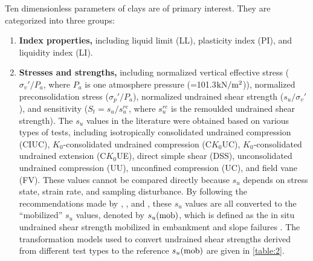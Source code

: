     
\begin{paracol}{2}
    
    Ten dimensionless parameters of clays are of primary interest. They are categorized into three groups:
    \begin{enumerate}
        \item \textbf{Index properties,} including liquid limit (LL), plasticity index (PI), and liquidity index (LI). 
        
        \item \textbf{Stresses and strengths,} including normalized vertical effective stress ($\sigma_v'/P_a$, where $P_a$ is one atmosphere pressure (=101.3$\rm{kN/m^2}$)), normalized preconsolidation stress ($\sigma_p'/P_a$), normalized undrained shear strength ($s_u/\sigma_v'$), and sensitivity ($S_t=s_u/s_u^{re}$, where $s_u^{re}$ is the remoulded undrained shear strength). The $s_u$ values in the literature were obtained based on various types of tests, including isotropically consolidated undrained compression (CIUC), $K_0$-consolidated undrained compression (C$K_0$UC), $K_0$-consolidated undrained extension (C$K_0$UE), direct simple shear (DSS), unconsolidated undrained compression (UU), unconfined compression (UC), and field vane (FV). These values cannot be compared directly because $s_u$ depends on stress state, strain rate, and sampling disturbance. By following the recommendations made by \citet{Bjerrum19721}, \citet{Kulhawy1990}, and \citet{Mesri20071}, these $s_u$ values are all converted to the “mobilized” $s_u$ values, denoted by $s_u(\rm{mob})$, which is defined as the in situ undrained shear strength mobilized in embankment and slope failures \citep{Mesri20071}. The transformation models used to convert undrained shear strengths derived from different test types to the reference $s_u(\rm{mob})$ are given in \autoref{table:2}. 
        

\end{enumerate}
\end{paracol}
